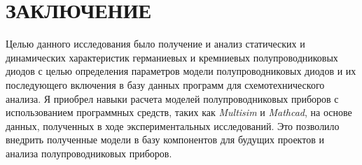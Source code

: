 \chapter*{ЗАКЛЮЧЕНИЕ}
Целью данного исследования было получение и анализ статических и
динамических характеристик германиевых и кремниевых полупроводниковых
диодов с целью определения параметров модели полупроводниковых диодов и
их последующего включения в базу данных программ для схемотехнического
анализа. Я приобрел навыки расчета моделей полупроводниковых приборов с
использованием программных средств, таких как \textit{Multisim} и \textit{Mathcad}, на основе
данных, полученных в ходе экспериментальных исследований. Это позволило
внедрить полученные модели в базу компонентов для будущих проектов и
анализа полупроводниковых приборов.